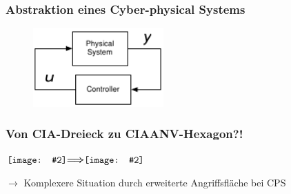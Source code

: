 \documentclass{sikslides}
\newcommand*{\vcenterimage}[2]{\vcenter{\hbox{\texttt{[image: \#2]}}}}
\newcommand*{\vcenterarrow}{\vcenter{\hbox{$\bm{\Longrightarrow}$}}}
\begin{document}
    \begin{frame}[label=abstrakt]
        \frametitle{Abstraktion eines Cyber-physical Systems}
        \begin{figure}
            \centering
            \includegraphics[width=5cm]{../figure/abstrakt}
        \end{figure}
    \end{frame}

    \begin{frame}
        \frametitle{Von CIA-Dreieck zu CIAANV-Hexagon?!}
        \centering
        $\vcenterimage{2.5cm}{../figure/cia}\vcenterarrow\vcenterimage{3.5cm}{../figure/triad}$

        \vspace{40px}
        $\rightarrow$ Komplexere Situation durch erweiterte Angriffsfläche bei CPS
    \end{frame}
\end{document}
